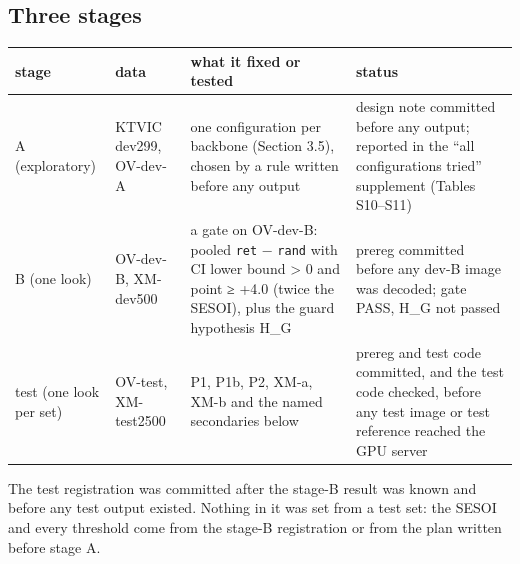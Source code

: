 \documentclass[manuscript,screen]{acmart}
\begin{document}
\subsection{Three stages}\label{three-stages}

\begin{longtable}[]{@{}
  >{\raggedright\arraybackslash}p{}
  >{\raggedright\arraybackslash}p{}
  >{\raggedright\arraybackslash}p{}
  >{\raggedright\arraybackslash}p{}@{}}
\toprule\noalign{}
\begin{minipage}[b]{\linewidth}\raggedright
stage
\end{minipage} & \begin{minipage}[b]{\linewidth}\raggedright
data
\end{minipage} & \begin{minipage}[b]{\linewidth}\raggedright
what it fixed or tested
\end{minipage} & \begin{minipage}[b]{\linewidth}\raggedright
status
\end{minipage} \\
\midrule\noalign{}
\endhead
\bottomrule\noalign{}
\endlastfoot
A (exploratory) & KTVIC dev299, OV-dev-A & one configuration per backbone (Section 3.5), chosen by a
rule written before any output & design note committed before any output; reported in the ``all
configurations tried'' supplement (Tables S10--S11) \\
B (one look) & OV-dev-B, XM-dev500 & a gate on OV-dev-B: pooled \texttt{ret} − \texttt{rand} with CI
lower bound \textgreater{} 0 and point ≥ +4.0 (twice the SESOI), plus the guard hypothesis H\_G &
prereg committed before any dev-B image was decoded; gate PASS, H\_G not passed \\
test (one look per set) & OV-test, XM-test2500 & P1, P1b, P2, XM-a, XM-b and the named secondaries
below & prereg and test code committed, and the test code checked, before any test image or test
reference reached the GPU server \\
\end{longtable}

The test registration was committed after the stage-B result was known and before any test output
existed. Nothing in it was set from a test set: the SESOI and every threshold come from the stage-B
registration or from the plan written before stage A.
\end{document}
